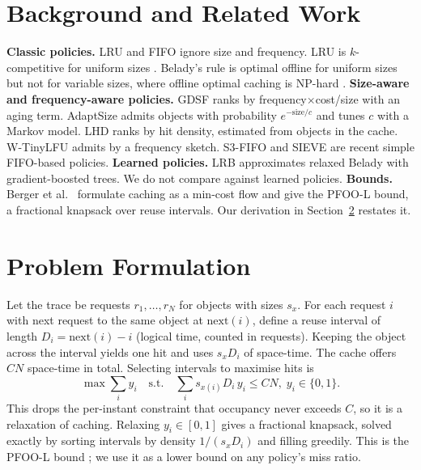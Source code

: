 \documentclass[conference]{IEEEtran}
\begin{document}
\section{Background and Related Work}
\textbf{Classic policies.} LRU and FIFO ignore size and frequency. LRU is $k$-competitive for uniform sizes
\cite{sleator}. Belady's rule \cite{belady} is optimal offline for uniform sizes but not for variable sizes, where
offline optimal caching is NP-hard \cite{pfoo}.
\textbf{Size-aware and frequency-aware policies.} GDSF \cite{gdsf} ranks by frequency$\times$cost/size with an
aging term. AdaptSize \cite{adaptsize} admits objects with probability $e^{-\text{size}/c}$ and tunes $c$ with a
Markov model. LHD \cite{lhd} ranks by hit density, estimated from objects in the cache. W-TinyLFU \cite{tinylfu}
admits by a frequency sketch. S3-FIFO \cite{s3fifo} and SIEVE \cite{sieve} are recent simple FIFO-based policies.
\textbf{Learned policies.} LRB \cite{lrb} approximates relaxed Belady with gradient-boosted trees. We do not compare
against learned policies.
\textbf{Bounds.} Berger et al.~\cite{pfoo} formulate caching as a min-cost flow and give the PFOO-L bound, a
fractional knapsack over reuse intervals. Our derivation in Section~\ref{sec:formulation} restates it.

\section{Problem Formulation}\label{sec:formulation}
Let the trace be requests $r_1,\dots,r_N$ for objects with sizes $s_x$. For each request $i$ with next request to
the same object at $\mathrm{next}(i)$, define a reuse interval of length $D_i=\mathrm{next}(i)-i$ (logical time,
counted in requests). Keeping the object across the interval yields one hit and uses $s_x D_i$ of space-time.
The cache offers $C N$ space-time in total. Selecting intervals to maximise hits is
\begin{equation}
\max \sum_i y_i \quad \text{s.t.} \quad \sum_i s_{x(i)} D_i\, y_i \le C N,\; y_i\in\{0,1\}.
\label{eq:kp}
\end{equation}
This drops the per-instant constraint that occupancy never exceeds $C$, so it is a relaxation of caching.
Relaxing $y_i\in[0,1]$ gives a fractional knapsack, solved exactly by sorting intervals by density
$1/(s_x D_i)$ and filling greedily. This is the PFOO-L bound \cite{pfoo}; we use it as a lower bound on any
policy's miss ratio.
\end{document}
